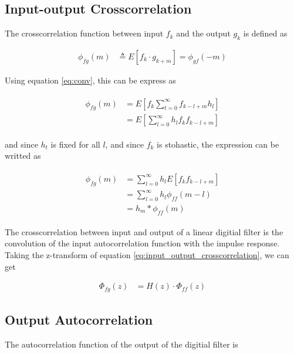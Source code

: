 \documentclass[8pt,a4paper]{article}
\begin{document}
\begin{multicols}{2}
\subsection*{Input-output Crosscorrelation}

The crosscorrelation function between input $f_{k}$ and the output $g_{k}$ is defined as


\begin{align}
  \phi_{fg}(m) &\triangleq E \left[ f_{k} \cdot g_{k+m} \right] = \phi_{gf}(-m)
\end{align}

Using equation \ref{eq:conv}, this can be express as

\begin{align}
  \begin{split}
    \phi_{fg}(m) &= E \left[ f_{k} \sum_{t=0}^{\infty} f_{k-l+m}h_{l} \right]\\
    &= E \left[ \sum_{l=0}^{\infty} h_{l} f_{k} f_{k-l+m} \right]
  \end{split}
\end{align}

and since $h_{t}$ is fixed for all $ l $, and since $f_{k}$ is stohastic, the expression can be writted as

\begin{align}
  \label{eq:input_output_crosscorrelation}
  \begin{split}
    \phi_{fg}(m) &= \sum_{l=0}^{\infty} h_{l} E \left[ f_{k} f_{k-l+m} \right] \\
    &= \sum_{l=0}^{\infty} h_{l} \phi_{ff}(m-l) \\
    &= h_{m} * \phi_{ff}(m)
  \end{split}
\end{align}

The crosscorrelation between input and output of a linear digitial filter is the convolution of the input autocorrelation function with the impulse response.
Taking the z-transform of equation \ref{eq:input_output_crosscorrelation}, we can get 

\begin{align}
  \Phi_{fg}(z)&=H(z) \cdot \Phi_{ff}(z)
\end{align}

\subsection*{Output Autocorrelation}
The autocorrelation function of the output of the digitial filter is


\end{multicols}
\end{document}
